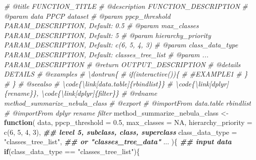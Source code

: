 \documentclass[
]{article}
\newenvironment{Shaded}{\begin{snugshade}}{\end{snugshade}}
\newcommand{\AttributeTok}[1]{\textcolor[rgb]{0.77,0.63,0.00}{#1}}
\newcommand{\CommentTok}[1]{\textcolor[rgb]{0.56,0.35,0.01}{\textit{#1}}}
\newcommand{\ConstantTok}[1]{\textcolor[rgb]{0.00,0.00,0.00}{#1}}
\newcommand{\ControlFlowTok}[1]{\textcolor[rgb]{0.13,0.29,0.53}{\textbf{#1}}}
\newcommand{\DecValTok}[1]{\textcolor[rgb]{0.00,0.00,0.81}{#1}}
\newcommand{\DocumentationTok}[1]{\textcolor[rgb]{0.56,0.35,0.01}{\textbf{\textit{#1}}}}
\newcommand{\FloatTok}[1]{\textcolor[rgb]{0.00,0.00,0.81}{#1}}
\newcommand{\FunctionTok}[1]{\textcolor[rgb]{0.00,0.00,0.00}{#1}}
\newcommand{\NormalTok}[1]{#1}
\newcommand{\OtherTok}[1]{\textcolor[rgb]{0.56,0.35,0.01}{#1}}
\newcommand{\SpecialCharTok}[1]{\textcolor[rgb]{0.00,0.00,0.00}{#1}}
\newcommand{\StringTok}[1]{\textcolor[rgb]{0.31,0.60,0.02}{#1}}
\begin{document}
\begin{Shaded}
\begin{Highlighting}[]
\CommentTok{\#\textquotesingle{} @title FUNCTION\_TITLE}
\CommentTok{\#\textquotesingle{} @description FUNCTION\_DESCRIPTION}
\CommentTok{\#\textquotesingle{} @param data PPCP dataset}
\CommentTok{\#\textquotesingle{} @param ppcp\_threshold PARAM\_DESCRIPTION, Default: 0.5}
\CommentTok{\#\textquotesingle{} @param max\_classes PARAM\_DESCRIPTION, Default: 5}
\CommentTok{\#\textquotesingle{} @param hierarchy\_priority PARAM\_DESCRIPTION, Default: c(6, 5, 4, 3)}
\CommentTok{\#\textquotesingle{} @param class\_data\_type PARAM\_DESCRIPTION, Default: \textquotesingle{}classes\_tree\_list\textquotesingle{}}
\CommentTok{\#\textquotesingle{} @param ... PARAM\_DESCRIPTION}
\CommentTok{\#\textquotesingle{} @return OUTPUT\_DESCRIPTION}
\CommentTok{\#\textquotesingle{} @details DETAILS}
\CommentTok{\#\textquotesingle{} @examples }
\CommentTok{\#\textquotesingle{} \textbackslash{}dontrun\{}
\CommentTok{\#\textquotesingle{} if(interactive())\{}
\CommentTok{\#\textquotesingle{}  \#EXAMPLE1}
\CommentTok{\#\textquotesingle{}  \}}
\CommentTok{\#\textquotesingle{} \}}
\CommentTok{\#\textquotesingle{} @seealso }
\CommentTok{\#\textquotesingle{}  \textbackslash{}code\{\textbackslash{}link[data.table]\{rbindlist\}\}}
\CommentTok{\#\textquotesingle{}  \textbackslash{}code\{\textbackslash{}link[dplyr]\{rename\}\}, \textbackslash{}code\{\textbackslash{}link[dplyr]\{filter\}\}}
\CommentTok{\#\textquotesingle{} @rdname method\_summarize\_nebula\_class}
\CommentTok{\#\textquotesingle{} @export }
\CommentTok{\#\textquotesingle{} @importFrom data.table rbindlist}
\CommentTok{\#\textquotesingle{} @importFrom dplyr rename filter}
\NormalTok{method\_summarize\_nebula\_class }\OtherTok{\textless{}{-}}
  \ControlFlowTok{function}\NormalTok{(}
\NormalTok{           data,}
           \AttributeTok{ppcp\_threshold =} \FloatTok{0.5}\NormalTok{,}
           \AttributeTok{max\_classes =} \ConstantTok{NA}\NormalTok{,}
           \AttributeTok{hierarchy\_priority =} \FunctionTok{c}\NormalTok{(}\DecValTok{6}\NormalTok{, }\DecValTok{5}\NormalTok{, }\DecValTok{4}\NormalTok{, }\DecValTok{3}\NormalTok{), }\DocumentationTok{\#\# level 5, subclass, class, superclass}
           \AttributeTok{class\_data\_type =} \StringTok{"classes\_tree\_list"}\NormalTok{, }\DocumentationTok{\#\# or "classes\_tree\_data"}
\NormalTok{           ...}
\NormalTok{           )\{}
    \DocumentationTok{\#\# input data }
    \ControlFlowTok{if}\NormalTok{(class\_data\_type }\SpecialCharTok{==} \StringTok{"classes\_tree\_list"}\NormalTok{)\{}

\end{Highlighting}
\end{Shaded}
\end{document}
